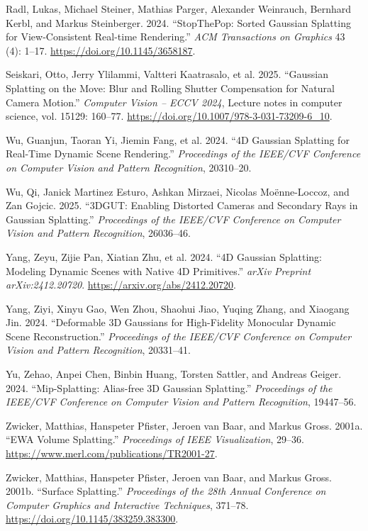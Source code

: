 \documentclass[
]{article}
\newlength{\cslhangindent}
\newenvironment{CSLReferences}[2] %
 {\begin{list}{}{%
  \setlength{\itemindent}{0pt}
  \setlength{\leftmargin}{0pt}
  \setlength{\parsep}{0pt}
  \ifodd #1
   \setlength{\leftmargin}{\cslhangindent}
   \setlength{\itemindent}{-1\cslhangindent}
  \fi
  \setlength{\itemsep}{#2\baselineskip}}}
 {\end{list}}
\begin{document}
\begin{CSLReferences}{1}{1}
Radl, Lukas, Michael Steiner, Mathias Parger, Alexander Weinrauch,
Bernhard Kerbl, and Markus Steinberger. 2024. {``{StopThePop: Sorted
Gaussian Splatting for View-Consistent Real-time Rendering}.''}
\emph{ACM Transactions on Graphics} 43 (4): 1--17.
\url{https://doi.org/10.1145/3658187}.

Seiskari, Otto, Jerry Ylilammi, Valtteri Kaatrasalo, et al. 2025.
{``{Gaussian Splatting on the Move: Blur and Rolling Shutter
Compensation for Natural Camera Motion}.''} \emph{Computer Vision --
ECCV 2024}, Lecture notes in computer science, vol. 15129: 160--77.
\url{https://doi.org/10.1007/978-3-031-73209-6_10}.

Wu, Guanjun, Taoran Yi, Jiemin Fang, et al. 2024. {``{4D Gaussian
Splatting for Real-Time Dynamic Scene Rendering}.''} \emph{Proceedings
of the IEEE/CVF Conference on Computer Vision and Pattern Recognition},
20310--20.

Wu, Qi, Janick Martinez Esturo, Ashkan Mirzaei, Nicolas Moënne-Loccoz,
and Zan Gojcic. 2025. {``{3DGUT: Enabling Distorted Cameras and
Secondary Rays in Gaussian Splatting}.''} \emph{Proceedings of the
IEEE/CVF Conference on Computer Vision and Pattern Recognition},
26036--46.

Yang, Zeyu, Zijie Pan, Xiatian Zhu, et al. 2024. {``{4D Gaussian
Splatting: Modeling Dynamic Scenes with Native 4D Primitives}.''}
\emph{arXiv Preprint arXiv:2412.20720}.
\url{https://arxiv.org/abs/2412.20720}.

Yang, Ziyi, Xinyu Gao, Wen Zhou, Shaohui Jiao, Yuqing Zhang, and
Xiaogang Jin. 2024. {``{Deformable 3D Gaussians for High-Fidelity
Monocular Dynamic Scene Reconstruction}.''} \emph{Proceedings of the
IEEE/CVF Conference on Computer Vision and Pattern Recognition},
20331--41.

Yu, Zehao, Anpei Chen, Binbin Huang, Torsten Sattler, and Andreas
Geiger. 2024. {``{Mip-Splatting: Alias-free 3D Gaussian Splatting}.''}
\emph{Proceedings of the IEEE/CVF Conference on Computer Vision and
Pattern Recognition}, 19447--56.

Zwicker, Matthias, Hanspeter Pfister, Jeroen van Baar, and Markus Gross.
2001a. {``{EWA Volume Splatting}.''} \emph{Proceedings of IEEE
Visualization}, 29--36.
\url{https://www.merl.com/publications/TR2001-27}.

Zwicker, Matthias, Hanspeter Pfister, Jeroen van Baar, and Markus Gross.
2001b. {``{Surface Splatting}.''} \emph{Proceedings of the 28th Annual
Conference on Computer Graphics and Interactive Techniques}, 371--78.
\url{https://doi.org/10.1145/383259.383300}.

\end{CSLReferences}
\end{document}
